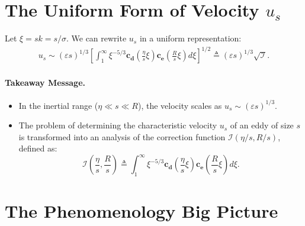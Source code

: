\documentclass[10pt]{article}
\begin{document}
\section{The Uniform Form of Velocity $u_s$}

Let $\xi = sk = s / \sigma$. We can rewrite $u_s$ in a uniform representation:
\begin{align*}
    u_s \sim \left( \varepsilon s \right) ^{1 / 3} \left[ \int_1^{\infty} \xi^{-5 / 3} \mathbf{c_d}\left( \frac{\eta}{s} \xi \right) \mathbf{c_e} \left( \frac{R}{s} \xi \right) d\xi \right]^{1 / 2}  \triangleq \left( \varepsilon s \right) ^{1 / 3} \sqrt{\mathcal{I} } 
.\end{align*}

\paragraph{Takeaway Message.}
\begin{itemize}
    \item In the inertial range ($\eta \ll s \ll R$), the velocity scales as $u_s \sim \left( \varepsilon s \right) ^{1 / 3} $.
    \item The problem of determining the characteristic velocity $u_s$ of an eddy of size $s$ is transformed into an analysis of the correction function $\mathcal{I}\left( \eta / s, R / s \right)$, defined as:
    \[
        \mathcal{I}\left( \frac{\eta}{s}, \frac{R}{s} \right)  \triangleq \int_1^{\infty} \xi^{-5 / 3} \mathbf{c_d}\left( \frac{\eta}{s} \xi \right) \mathbf{c_e} \left( \frac{R}{s} \xi \right) d\xi.
    \]
\end{itemize}

\section{The Phenomenology Big Picture}
\end{document}
